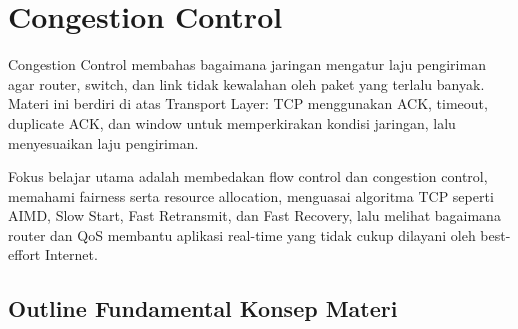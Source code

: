 \section{Congestion Control}

Congestion Control membahas bagaimana jaringan mengatur laju pengiriman agar router, switch, dan link tidak kewalahan oleh paket yang terlalu banyak. Materi ini berdiri di atas Transport Layer: TCP menggunakan ACK, timeout, duplicate ACK, dan window untuk memperkirakan kondisi jaringan, lalu menyesuaikan laju pengiriman.

Fokus belajar utama adalah membedakan flow control dan congestion control, memahami fairness serta resource allocation, menguasai algoritma TCP seperti AIMD, Slow Start, Fast Retransmit, dan Fast Recovery, lalu melihat bagaimana router dan QoS membantu aplikasi real-time yang tidak cukup dilayani oleh best-effort Internet.

\subsection{Outline Fundamental Konsep Materi}

